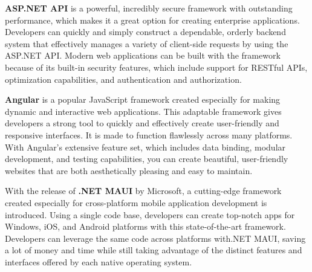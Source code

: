 \textbf{ASP.NET API} is a powerful, incredibly secure framework with outstanding performance, which makes it a great option for creating enterprise applications. Developers can quickly and simply construct a dependable, orderly backend system that effectively manages a variety of client-side requests by using the ASP.NET API. Modern web applications can be built with the framework because of its built-in security features, which include support for RESTful APIs, optimization capabilities, and authentication and authorization.

\textbf{Angular} is a popular JavaScript framework created especially for making dynamic and interactive web applications. This adaptable framework gives developers a strong tool to quickly and effectively create user-friendly and responsive interfaces. It is made to function flawlessly across many platforms. With Angular's extensive feature set, which includes data binding, modular development, and testing capabilities, you can create beautiful, user-friendly websites that are both aesthetically pleasing and easy to maintain.

With the release of \textbf{.NET MAUI} by Microsoft, a cutting-edge framework created especially for cross-platform mobile application development is introduced. Using a single code base, developers can create top-notch apps for Windows, iOS, and Android platforms with this state-of-the-art framework. Developers can leverage the same code across platforms with.NET MAUI, saving a lot of money and time while still taking advantage of the distinct features and interfaces offered by each native operating system.


